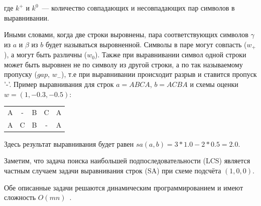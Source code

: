 где $k^{+}$ и $k^{0}$~--- количество совпадающих и несовпадающих пар символов в выравнивании.


Иными словами, когда две строки выровнены, пара соответствующих символов $\gamma$ из $a$ и $\beta$  из $b$ будет называться выровненной.
Символы в паре могут совпасть ($w_{+}$), а могут быть различны ($w_{0}$).
Также при выравнивании символ одной строки может  быть выровнен не по символу из другой строки, а по так называемому пропуску ($gap$, $w_{-}$), т.е при выравнивании происходит разрыв и ставится пропуск '-'.
Пример выравнивания для строк $a=ABCA$, $b=ACBA$ и схемы оценки $w = (1, -0.3, -0.5)$:
\begin{center}
    \begin{tabular}{ccccc}
    A & - & B &  C  &  A \\
    A & C & B &  - &  A
    \end{tabular}
\end{center}
Здесь результат выравнивания будет равен $sa(a,b) = 3*1.0-2*0.5 = 2.0$.

Заметим, что задача поиска наибольшей подпоследовательности (LCS) является частным случаем задачи выравнивания строк (SA) при схеме подсчёта $(1,0,0)$.

Обе описанные задачи решаются динамическим программированием
и имеют сложность $O(mn)$~\cite{huang1994global}.

